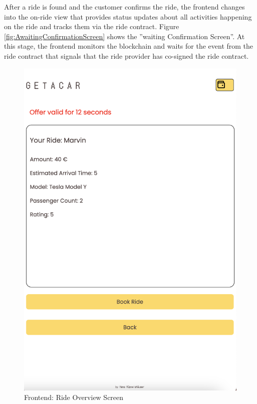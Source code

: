 After a ride is found and the customer confirms the ride, the frontend changes into the on-ride view that provides status updates about all activities happening on the ride and tracks them via the ride contract. Figure \ref{fig:AwaitingConfirmationScreen} shows the ''waiting Confirmation Screen''. At this stage, the frontend monitors the blockchain and waits for the event from the ride contract that signals that the ride provider has co-signed the ride contract.


\begin{figure}[H]
    \centering
    
    \begin{minipage}{0.45\linewidth}
        \centering
        \includegraphics[width=\linewidth]{data/ffss/5.png}
        \caption{Frontend: Ride Overview Screen}

\end{minipage}
\end{figure}
